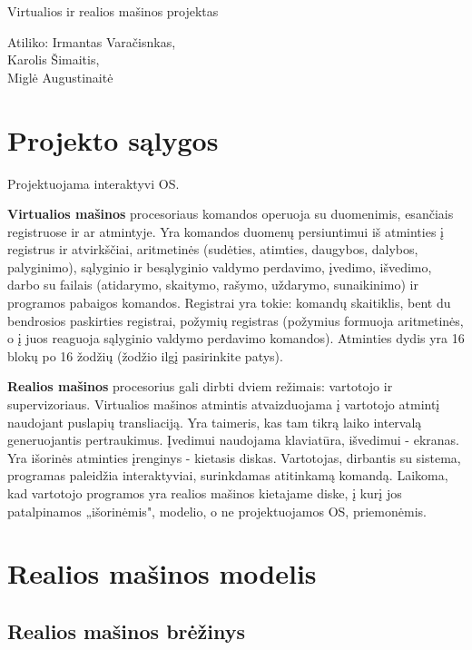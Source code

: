 \documentclass[12pt]{article}
\begin{document}
	\begin{titlepage}
		\begin{center}
		\Huge Virtualios ir realios mašinos projektas\\
		[4cm]
		\end{center}
		\begin{flushright}
		Atiliko:
		Irmantas Varačisnkas,\\
		Karolis Šimaitis,\\
		Miglė Augustinaitė\\
		\end{flushright}
	
	\end{titlepage}
	\tableofcontents
	\clearpage
	\section{Projekto sąlygos}
	Projektuojama interaktyvi OS.
	
	\textbf{Virtualios mašinos} procesoriaus komandos operuoja su duomenimis, esančiais registruose ir ar 		atmintyje. Yra komandos duomenų persiuntimui iš atminties į registrus ir atvirkščiai, aritmetinės (sudėties, atimties, daugybos, dalybos, palyginimo), sąlyginio ir besąlyginio valdymo perdavimo, įvedimo, išvedimo, darbo su failais (atidarymo, skaitymo, rašymo, uždarymo, sunaikinimo) ir programos pabaigos komandos. Registrai yra tokie: komandų skaitiklis, bent du bendrosios paskirties registrai, požymių registras (požymius formuoja aritmetinės, o į juos reaguoja sąlyginio valdymo perdavimo komandos). Atminties dydis yra 16 blokų po 16 žodžių (žodžio ilgį pasirinkite patys).
	
	\textbf{Realios mašinos} procesorius gali dirbti dviem režimais: vartotojo ir supervizoriaus. Virtualios mašinos atmintis atvaizduojama į vartotojo atmintį naudojant puslapių transliaciją. Yra taimeris, kas tam tikrą laiko intervalą generuojantis pertraukimus. Įvedimui naudojama klaviatūra, išvedimui - ekranas. Yra išorinės atminties įrenginys - kietasis diskas.
Vartotojas, dirbantis su sistema, programas paleidžia interaktyviai, surinkdamas atitinkamą komandą. Laikoma, kad vartotojo programos yra realios mašinos kietajame diske, į kurį jos patalpinamos „išorinėmis", modelio, o ne projektuojamos OS, priemonėmis.
	\clearpage
	\section{Realios mašinos modelis}
	\subsection{Realios mašinos brėžinys}
	
\end{document}
